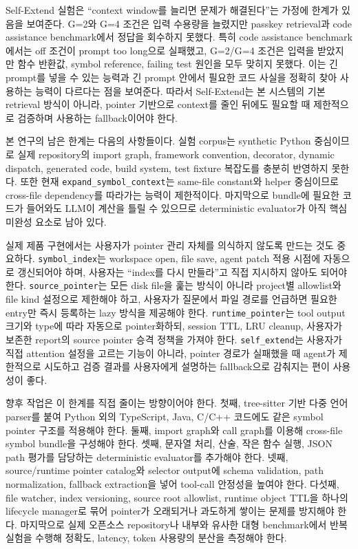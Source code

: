 \documentclass[11pt,a4paper]{article}
\begin{document}
Self-Extend 실험은 ``context window를 늘리면 문제가 해결된다''는 가정에 한계가 있음을 보여준다. G=2와 G=4 조건은 입력 수용량을 늘렸지만 passkey retrieval과 code assistance benchmark에서 정답을 회수하지 못했다. 특히 code assistance benchmark에서는 off 조건이 prompt too long으로 실패했고, G=2/G=4 조건은 입력을 받았지만 함수 반환값, symbol reference, failing test 원인을 모두 맞히지 못했다. 이는 긴 prompt를 넣을 수 있는 능력과 긴 prompt 안에서 필요한 코드 사실을 정확히 찾아 사용하는 능력이 다르다는 점을 보여준다. 따라서 Self-Extend는 본 시스템의 기본 retrieval 방식이 아니라, pointer 기반으로 context를 줄인 뒤에도 필요할 때 제한적으로 검증하며 사용하는 fallback이어야 한다.

본 연구의 남은 한계는 다음의 사항들이다. 실험 corpus는 synthetic Python 중심이므로 실제 repository의 import graph, framework convention, decorator, dynamic dispatch, generated code, build system, test fixture 복잡도를 충분히 반영하지 못한다. 또한 현재 \texttt{expand\_symbol\_context}는 same-file constant와 helper 중심이므로 cross-file dependency를 따라가는 능력이 제한적이다. 마지막으로 bundle에 필요한 코드가 들어와도 LLM이 계산을 틀릴 수 있으므로 deterministic evaluator가 아직 핵심 미완성 요소로 남아 있다.

실제 제품 구현에서는 사용자가 pointer 관리 자체를 의식하지 않도록 만드는 것도 중요하다. \texttt{symbol\_index}는 workspace open, file save, agent patch 적용 시점에 자동으로 갱신되어야 하며, 사용자는 ``index를 다시 만들라''고 직접 지시하지 않아도 되어야 한다. \texttt{source\_pointer}는 모든 disk file을 훑는 방식이 아니라 project별 allowlist와 file kind 설정으로 제한해야 하고, 사용자가 질문에서 파일 경로를 언급하면 필요한 entry만 즉시 등록하는 lazy 방식을 제공해야 한다. \texttt{runtime\_pointer}는 tool output 크기와 type에 따라 자동으로 pointer화하되, session TTL, LRU cleanup, 사용자가 보존한 report의 source pointer 승격 정책을 가져야 한다. \texttt{self\_extend}는 사용자가 직접 attention 설정을 고르는 기능이 아니라, pointer 경로가 실패했을 때 agent가 제한적으로 시도하고 검증 결과를 사용자에게 설명하는 fallback으로 감춰지는 편이 사용성이 좋다.

향후 작업은 이 한계를 직접 줄이는 방향이어야 한다. 첫째, tree-sitter 기반 다중 언어 parser를 붙여 Python 외의 TypeScript, Java, C/C++ 코드에도 같은 symbol pointer 구조를 적용해야 한다. 둘째, import graph와 call graph를 이용해 cross-file symbol bundle을 구성해야 한다. 셋째, 문자열 처리, 산술, 작은 함수 실행, JSON path 평가를 담당하는 deterministic evaluator를 추가해야 한다. 넷째, source/runtime pointer catalog와 selector output에 schema validation, path normalization, fallback extraction을 넣어 tool-call 안정성을 높여야 한다. 다섯째, file watcher, index versioning, source root allowlist, runtime object TTL을 하나의 lifecycle manager로 묶어 pointer가 오래되거나 과도하게 쌓이는 문제를 방지해야 한다. 마지막으로 실제 오픈소스 repository나 내부와 유사한 대형 benchmark에서 반복 실험을 수행해 정확도, latency, token 사용량의 분산을 측정해야 한다.
\end{document}
